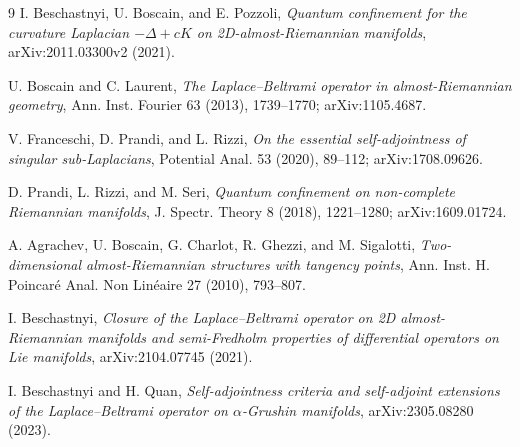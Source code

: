\documentclass[11pt]{article}
\begin{document}
\begin{thebibliography}{9}
I. Beschastnyi, U. Boscain, and E. Pozzoli,
\emph{Quantum confinement for the curvature Laplacian $-\Delta+cK$ on
2D-almost-Riemannian manifolds}, arXiv:2011.03300v2 (2021).

U. Boscain and C. Laurent,
\emph{The Laplace--Beltrami operator in almost-Riemannian geometry},
Ann. Inst. Fourier 63 (2013), 1739--1770; arXiv:1105.4687.

V. Franceschi, D. Prandi, and L. Rizzi,
\emph{On the essential self-adjointness of singular sub-Laplacians},
Potential Anal. 53 (2020), 89--112; arXiv:1708.09626.

D. Prandi, L. Rizzi, and M. Seri,
\emph{Quantum confinement on non-complete Riemannian manifolds},
J. Spectr. Theory 8 (2018), 1221--1280; arXiv:1609.01724.

A. Agrachev, U. Boscain, G. Charlot, R. Ghezzi, and M. Sigalotti,
\emph{Two-dimensional almost-Riemannian structures with tangency points},
Ann. Inst. H. Poincar\'e Anal. Non Lin\'eaire 27 (2010), 793--807.

I. Beschastnyi,
\emph{Closure of the Laplace--Beltrami operator on 2D almost-Riemannian
manifolds and semi-Fredholm properties of differential operators on Lie
manifolds}, arXiv:2104.07745 (2021).

I. Beschastnyi and H. Quan,
\emph{Self-adjointness criteria and self-adjoint extensions of the
Laplace--Beltrami operator on $\alpha$-Grushin manifolds},
arXiv:2305.08280 (2023).
\end{thebibliography}
\end{document}
